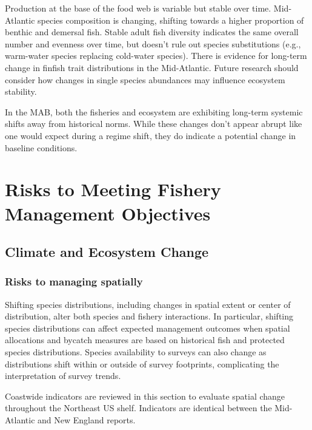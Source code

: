 \documentclass[
  10pt,
]{article}
\begin{document}
Production at the base of the food web is variable but stable over time. Mid-Atlantic species composition is changing, shifting towards a higher proportion of benthic and demersal fish. Stable adult fish diversity indicates the same overall number and evenness over time, but doesn't rule out species substitutions (e.g., warm-water species replacing cold-water species). There is evidence for long-term change in finfish trait distributions in the Mid-Atlantic. Future research should consider how changes in single species abundances may influence ecosystem stability.

In the MAB, both the fisheries and ecosystem are exhibiting long-term systemic shifts away from historical norms. While these changes don't appear abrupt like one would expect during a regime shift, they do indicate a potential change in baseline conditions.

\newpage

\section{Risks to Meeting Fishery Management Objectives}\label{risks-to-meeting-fishery-management-objectives}

\subsection{Climate and Ecosystem Change}\label{climate-and-ecosystem-change}

\subsubsection{Risks to managing spatially}\label{risks-to-managing-spatially}

Shifting species distributions, including changes in spatial extent or center of distribution, alter both species and fishery interactions. In particular, shifting species distributions can affect expected management outcomes when spatial allocations and bycatch measures are based on historical fish and protected species distributions. Species availability to surveys can also change as distributions shift within or outside of survey footprints, complicating the interpretation of survey trends.

Coastwide indicators are reviewed in this section to evaluate spatial change throughout the Northeast US shelf. Indicators are identical between the Mid-Atlantic and New England reports.
\end{document}
